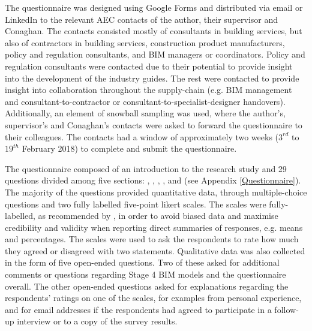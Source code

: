 The questionnaire was designed using Google Forms and distributed via email or LinkedIn to the relevant AEC contacts of the author, their supervisor and Conaghan.
The contacts consisted mostly of consultants in building services, but also of contractors in building services, construction product manufacturers, policy and regulation consultants, and BIM managers or coordinators.
Policy and regulation consultants were contacted due to their potential to provide insight into the development of the industry guides.
The rest were contacted to provide insight into collaboration throughout the supply-chain (e.g. BIM management and consultant-to-contractor or consultant-to-specialist-designer handovers).
Additionally, an element of snowball sampling was used, where the author's, supervisor's and Conaghan's contacts were asked to forward the questionnaire to their colleagues.
The contacts had a window of approximately two weeks ($ 3^{rd} $ to $ 19^{th} $ February 2018) to complete and submit the questionnaire.

The questionnaire composed of an introduction to the research study and 29 questions divided among five sections: , , , , and  (see Appendix \ref{Questionnaire}).
The majority of the questions provided quantitative data, through multiple-choice questions and two fully labelled five-point likert scales.
The scales were fully-labelled, as recommended by \cite{Vaerenbergh2012}, in order to avoid biased data and maximise credibility and validity when reporting direct summaries of responses, e.g. means and percentages.
The scales were used to ask the respondents to rate how much they agreed or disagreed with two statements.
Qualitative data was also collected in the form of five open-ended questions.
Two of these asked for additional comments or questions regarding Stage 4 BIM models and the questionnaire overall.
The other open-ended questions asked for explanations regarding the respondents' ratings on one of the scales, for examples from personal experience, and for email addresses if the respondents had agreed to participate in a follow-up interview or to a copy of the survey results.

